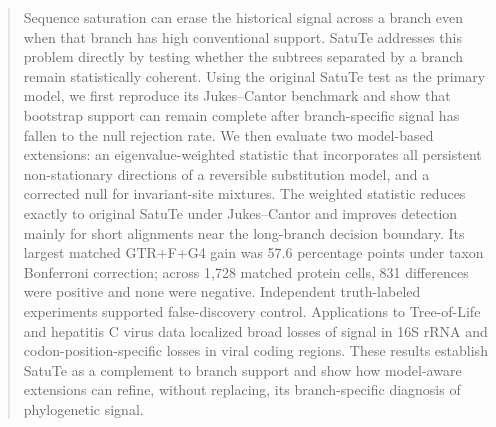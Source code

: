 \begin{abstract}
Sequence saturation can erase the historical signal across a branch even when that branch has high conventional support. SatuTe addresses this problem directly by testing whether the subtrees separated by a branch remain statistically coherent. Using the original SatuTe test as the primary model, we first reproduce its Jukes--Cantor benchmark and show that bootstrap support can remain complete after branch-specific signal has fallen to the null rejection rate. We then evaluate two model-based extensions: an eigenvalue-weighted statistic that incorporates all persistent non-stationary directions of a reversible substitution model, and a corrected null for invariant-site mixtures. The weighted statistic reduces exactly to original SatuTe under Jukes--Cantor and improves detection mainly for short alignments near the long-branch decision boundary. Its largest matched GTR+F+G4 gain was 57.6 percentage points under taxon Bonferroni correction; across 1,728 matched protein cells, 831 differences were positive and none were negative. Independent truth-labeled experiments supported false-discovery control. Applications to Tree-of-Life and hepatitis C virus data localized broad losses of signal in 16S rRNA and codon-position-specific losses in viral coding regions. These results establish SatuTe as a complement to branch support and show how model-aware extensions can refine, without replacing, its branch-specific diagnosis of phylogenetic signal.
\end{abstract}
